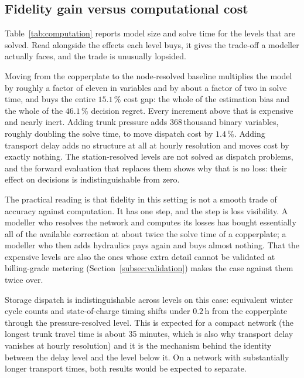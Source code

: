 
\subsection{Fidelity gain versus computational cost}
\label{subsec:computation}

Table~\ref{tab:computation} reports model size and solve time for the levels that are
solved. Read alongside the effects each level buys, it gives the trade-off a modeller
actually faces, and the trade is unusually lopsided.

Moving from the copperplate to the node-resolved baseline multiplies the model by roughly
a factor of eleven in variables and by about a factor of two in solve time, and buys the
entire $15.1$\,\% cost gap: the whole of the estimation bias and the whole of the
$46.1$\,\% decision regret. Every increment above that is expensive and nearly inert.
Adding trunk pressure adds $368$\,thousand binary variables, roughly doubling the solve
time, to move dispatch cost by $1.4$\,\%. Adding transport delay adds no structure at all
at hourly resolution and moves cost by exactly nothing. The station-resolved levels are
not solved as dispatch problems, and the forward evaluation that replaces them shows why
that is no loss: their effect on decisions is indistinguishable from zero.

The practical reading is that fidelity in this setting is not a smooth trade of accuracy
against computation. It has one step, and the step is loss visibility. A modeller who
resolves the network and computes its losses has bought essentially all of the available
correction at about twice the solve time of a copperplate; a modeller who then adds
hydraulics pays again and buys almost nothing. That the expensive levels are also the ones
whose extra detail cannot be validated at billing-grade metering
(Section~\ref{subsec:validation}) makes the case against them twice over.

Storage dispatch is indistinguishable across levels on this case: equivalent winter cycle
counts and state-of-charge timing shifts under $0.2$\,h from the copperplate through the
pressure-resolved level. This is expected for a compact network (the longest trunk travel
time is about 35 minutes, which is also why transport delay vanishes at hourly resolution)
and it is the mechanism behind the identity between the delay level and the level below
it. On a network with substantially longer transport times, both results would be expected
to separate.
